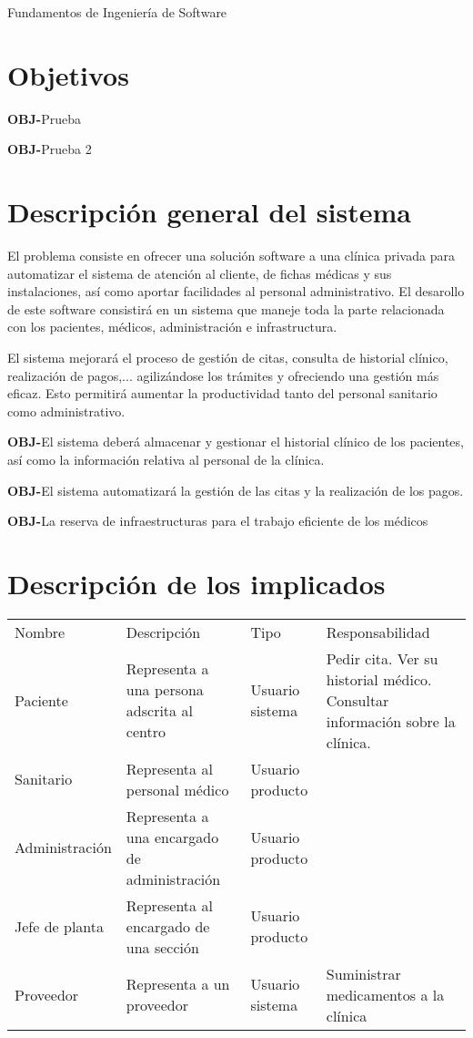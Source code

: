\documentclass[11pt,a4paper]{article}
\newcounter{ObjCounter}
\newcommand{\obj}[1]{\addtocounter{ObjCounter}{1}\textbf{\rmfamily OBJ-\theObjCounter}\quad#1\\}
\begin{document}
{\Huge{Fundamentos de Ingeniería de Software}}

\section{Objetivos} %
\label{sec:estudio_del_dominio_del_problema}

\obj{Prueba}
\obj{Prueba 2}



\section{Descripción general del sistema} %
\label{sec:descripción_general_del_sisetema}

El problema consiste en ofrecer una solución software a una clínica privada para automatizar el sistema de atención al cliente, de fichas médicas y sus instalaciones, así como aportar facilidades al personal administrativo. El desarollo de este software consistirá en un sistema que maneje toda la parte relacionada con los pacientes, médicos, administración e infrastructura.

El sistema mejorará el proceso de gestión de citas, consulta de historial clínico, realización de pagos,... agilizándose los trámites y ofreciendo una gestión más eficaz. Esto permitirá aumentar la productividad tanto del personal sanitario como administrativo.

\obj{El sistema deberá almacenar y gestionar el historial clínico de  los pacientes, así como la información relativa al personal de la clínica.}

\obj{El sistema automatizará la gestión de las citas y la realización de los pagos.}

\obj{La reserva de infraestructuras para el trabajo eficiente de los médicos}

\section{Descripción de los implicados} %
\label{sec:descripción_de_los_implicados}

	\begin{tabular}{lp{3cm}lp{4cm}}
		Nombre & Descripción & Tipo & Responsabilidad \\
		Paciente & Representa a una persona adscrita al centro & Usuario sistema & Pedir cita. Ver su historial médico. Consultar información sobre la clínica. \\
		Sanitario & Representa al personal médico & Usuario producto & \\
		Administración & Representa a una encargado de administración & Usuario producto & \\
		Jefe de planta & Representa al encargado de una sección & Usuario producto & \\
		Proveedor & Representa a un proveedor & Usuario sistema & Suministrar medicamentos a la clínica
	\end{tabular}
\end{document}
